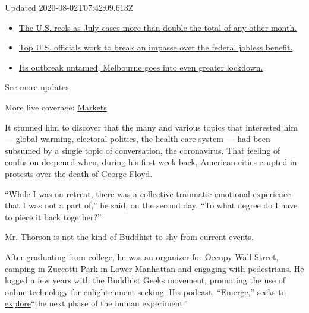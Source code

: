 Updated 2020-08-02T07:42:09.613Z

\begin{itemize}
\tightlist
\item
  \href{https://www.nytimes.com/2020/08/01/world/coronavirus-covid-19.html?action=click\&pgtype=Article\&state=default\&region=MAIN_CONTENT_1\&context=storylines_live_updates\#link-34047410}{The
  U.S. reels as July cases more than double the total of any other
  month.}
\item
  \href{https://www.nytimes.com/2020/08/01/world/coronavirus-covid-19.html?action=click\&pgtype=Article\&state=default\&region=MAIN_CONTENT_1\&context=storylines_live_updates\#link-780ec966}{Top
  U.S. officials work to break an impasse over the federal jobless
  benefit.}
\item
  \href{https://www.nytimes.com/2020/08/01/world/coronavirus-covid-19.html?action=click\&pgtype=Article\&state=default\&region=MAIN_CONTENT_1\&context=storylines_live_updates\#link-2bc8948}{Its
  outbreak untamed, Melbourne goes into even greater lockdown.}
\end{itemize}

\href{https://www.nytimes.com/2020/08/01/world/coronavirus-covid-19.html?action=click\&pgtype=Article\&state=default\&region=MAIN_CONTENT_1\&context=storylines_live_updates}{See
more updates}

More live coverage:
\href{https://www.nytimes.com/live/2020/07/31/business/stock-market-today-coronavirus?action=click\&pgtype=Article\&state=default\&region=MAIN_CONTENT_1\&context=storylines_live_updates}{Markets}

It stunned him to discover that the many and various topics that
interested him --- global warming, electoral politics, the health care
system --- had been subsumed by a single topic of conversation, the
coronavirus. That feeling of confusion deepened when, during his first
week back, American cities erupted in protests over the death of George
Floyd.

``While I was on retreat, there was a collective traumatic emotional
experience that I was not a part of,'' he said, on the second day. ``To
what degree do I have to piece it back together?''

Mr. Thorson is not the kind of Buddhist to shy from current events.

After graduating from college, he was an organizer for Occupy Wall
Street, camping in Zuccotti Park in Lower Manhattan and engaging with
pedestrians. He logged a few years with the Buddhist Geeks movement,
promoting the use of online technology for enlightenment seeking. His
podcast, ``Emerge,''
\href{https://podcasts.apple.com/us/podcast/emerge-making-sense-of-whats-next/id1057220344}{seeks
to explore}``the next phase of the human experiment.''

